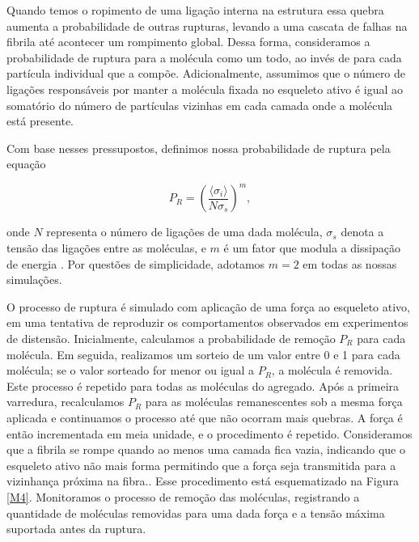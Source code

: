 \documentclass{article}
\begin{document}
        Quando temos o ropimento de uma ligação interna na estrutura essa quebra aumenta a probabilidade de outras rupturas, levando a 
        uma cascata de falhas na fibrila até acontecer um rompimento global. Dessa forma, consideramos a probabilidade de ruptura para 
        a molécula como um todo, ao invés de para cada partícula individual que a compõe. Adicionalmente, assumimos que o número de 
        ligações responsáveis por manter a molécula fixada no esqueleto ativo é igual ao somatório do número de partículas vizinhas em 
        cada camada onde a molécula está presente. 

        Com base nesses pressupostos, definimos nossa probabilidade de ruptura pela equação 

        \begin{equation}
            P_{R} = \left(\frac{\langle \sigma_{i} \rangle}{N \sigma_{s}}\right)^{m},
        \end{equation}

        \noindent onde \(N\) representa o número de ligações de uma dada molécula, \(\sigma_{s}\) denota a tensão das ligações entre as 
        moléculas, e \(m\) é um fator que modula a dissipação de energia \cite{Parkinson1997,2013}. Por questões de simplicidade, adotamos 
        \(m = 2\) em todas as nossas simulações.

        O processo de ruptura é simulado com aplicação de uma força ao esqueleto ativo, em uma tentativa de reproduzir os comportamentos observados 
        em experimentos de distensão. Inicialmente, calculamos a probabilidade de remoção \(P_{R}\) para cada molécula. Em seguida, realizamos um 
        sorteio de um valor entre 0 e 1 para cada molécula; se o valor sorteado for menor ou igual a \(P_{R}\), a molécula é removida. Este processo 
        é repetido para todas as moléculas do agregado. Após a primeira varredura, recalculamos \(P_{R}\) para as moléculas remanescentes sob a mesma 
        força aplicada e continuamos o processo até que não ocorram mais quebras. A força é então incrementada em meia unidade, e o procedimento é 
        repetido. Consideramos que a fibrila se rompe quando ao menos uma camada fica vazia, indicando que o esqueleto ativo não mais forma permitindo 
        que a força seja transmitida para a vizinhança próxima na fibra.. Esse procedimento está esquematizado na Figura \ref{M4}. Monitoramos o 
        processo de remoção das moléculas, registrando a quantidade de moléculas removidas para uma dada força e a tensão máxima suportada antes da 
        ruptura. 
\end{document}
